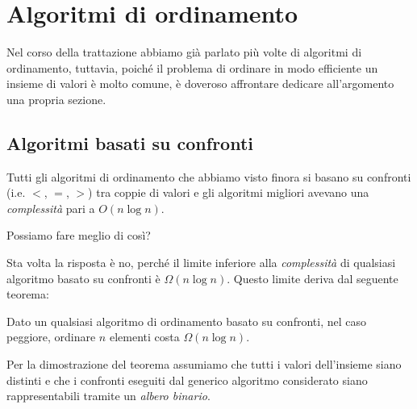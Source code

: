 \chapter{Algoritmi di ordinamento}
Nel corso della trattazione abbiamo già parlato più volte di algoritmi di
ordinamento, tuttavia, poiché il problema di ordinare in modo efficiente un
insieme di valori è molto comune, è doveroso affrontare dedicare all'argomento
una propria sezione.

\section{Algoritmi basati su confronti}
Tutti gli algoritmi di ordinamento che abbiamo visto finora si basano su
confronti (i.e. $<$, $=$, $>$) tra coppie di valori e gli algoritmi migliori
avevano una \emph{complessità} pari a $O(n\log n)$.

\bigskip\noindent
Possiamo fare meglio di così?

Sta volta la risposta è no, perché il limite inferiore alla \emph{complessità}
di qualsiasi algoritmo basato su confronti è $\Omega(n\log n)$. Questo limite
deriva dal seguente teorema:

\begin{definition}
    Dato un qualsiasi algoritmo di ordinamento basato su confronti, nel caso
    peggiore, ordinare $n$ elementi costa $\Omega(n\log n)$.
\end{definition}
\begin{note}
    Per la dimostrazione del teorema assumiamo che tutti i valori dell'insieme
    siano distinti e che i confronti eseguiti dal generico algoritmo considerato
    siano rappresentabili tramite un \emph{albero binario}.
\end{note}

